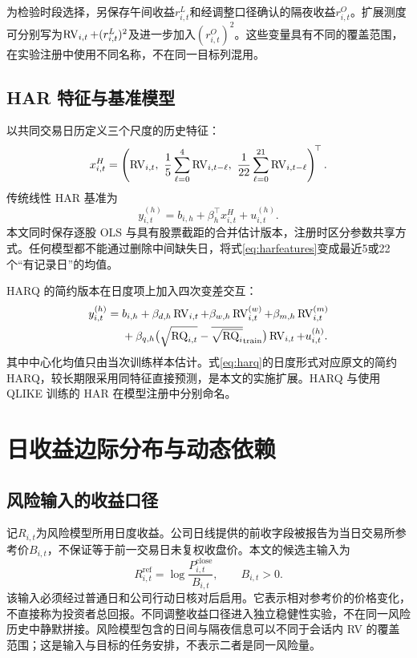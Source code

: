 为检验时段选择，另保存午间收益$r^{L}_{i,t}$和经调整口径确认的隔夜收益$r^{O}_{i,t}$。扩展测度可分别写为$\operatorname{RV}_{i,t}+(r^L_{i,t})^2$及进一步加入$(r^O_{i,t})^2$。这些变量具有不同的覆盖范围，在实验注册中使用不同名称，不在同一目标列混用。

\subsection{HAR 特征与基准模型}
以共同交易日历定义三个尺度的历史特征：
\begin{equation}\label{eq:harfeatures}
x^{H}_{i,t}=\left(\RV_{i,t},\ \frac15\sum_{\ell=0}^{4}\RV_{i,t-\ell},\ \frac1{22}\sum_{\ell=0}^{21}\RV_{i,t-\ell}\right)^{\!\top}.
\end{equation}
传统线性 HAR 基准为
\begin{equation}\label{eq:har}
y_{i,t}^{(h)}=b_{i,h}+\beta_h^{\top}x^{H}_{i,t}+u_{i,t}^{(h)}.
\end{equation}
本文同时保存逐股 OLS 与具有股票截距的合并估计版本，注册时区分参数共享方式。任何模型都不能通过删除中间缺失日，将式\eqref{eq:harfeatures}变成最近5或22个“有记录日”的均值。

HARQ 的简约版本在日度项上加入四次变差交互\cite{bpq2016}：
\begin{align}
y_{i,t}^{(h)}={}&b_{i,h}+\beta_{d,h}\operatorname{RV}_{i,t}
 +\beta_{w,h}\operatorname{RV}_{i,t}^{(w)}+\beta_{m,h}\operatorname{RV}_{i,t}^{(m)}\nonumber\\
&+\beta_{q,h}\big(\sqrt{\operatorname{RQ}_{i,t}}-\overline{\sqrt{\operatorname{RQ}_i}}_{\mathrm{train}}\big)\operatorname{RV}_{i,t}
+u_{i,t}^{(h)}.\label{eq:harq}
\end{align}
其中中心化均值只由当次训练样本估计。式\eqref{eq:harq}的日度形式对应原文的简约 HARQ，较长期限采用同特征直接预测，是本文的实施扩展。HARQ 与使用 QLIKE 训练的 HAR 在模型注册中分别命名。

\section{日收益边际分布与动态依赖}
\subsection{风险输入的收益口径}
记$R_{i,t}$为风险模型所用日度收益。公司日线提供的前收字段被报告为当日交易所参考价$B_{i,t}$，不保证等于前一交易日未复权收盘价。本文的候选主输入为
\begin{equation}\label{eq:reference_return}
R^{\mathrm{ref}}_{i,t}=\log\frac{P^{\mathrm{close}}_{i,t}}{B_{i,t}},\qquad B_{i,t}>0.
\end{equation}
该输入必须经过普通日和公司行动日核对后启用。它表示相对参考价的价格变化，不直接称为投资者总回报。不同调整收益口径进入独立稳健性实验，不在同一风险历史中静默拼接。风险模型包含的日间与隔夜信息可以不同于会话内 RV 的覆盖范围；这是输入与目标的任务安排，不表示二者是同一风险量。

